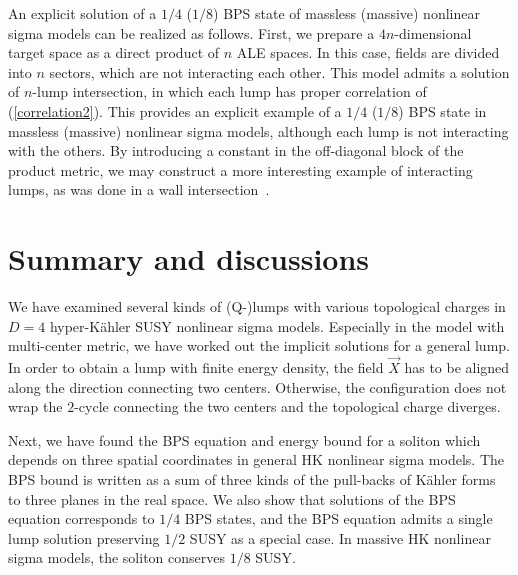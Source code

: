 \documentclass[a4paper,12pt]{article}
\newcommand{\kahler}{K\"{a}hler }
\begin{document}
An explicit solution of 
a $1/4$ ($1/8$) BPS state 
of massless (massive) nonlinear sigma models 
can be realized as follows. 
First, we prepare a $4n$-dimensional target space as  
a direct product of $n$ ALE spaces. 
In this case, fields are divided into $n$ sectors, 
which are not interacting  each other. 
This model admits a solution of $n$-lump intersection, 
in which each lump has proper 
correlation of (\ref{correlation2}). 
This provides an explicit example of a $1/4$ ($1/8$) BPS state 
in massless (massive) nonlinear sigma models, 
although each lump is not interacting with the others.
By introducing a constant in 
the off-diagonal block of the product metric, 
we may construct 
a more interesting example of 
interacting lumps, 
as was done in a wall intersection~\cite{Townsend1}.

\vspace{5mm}

\section{Summary and discussions}
\label{sc:Summary}
We have examined several kinds of (Q-)lumps with various topological 
charges in $D=4$ hyper-\kahler SUSY nonlinear sigma models. 
Especially 
in the model 
with multi-center metric, we have worked 
out the implicit solutions for a general 
lump. 
In order to obtain a lump with finite energy density, 
the field $\vec{X}$ has to be aligned along the direction 
connecting two centers. 
Otherwise, the configuration does not wrap the $2$-cycle connecting 
the two centers and the topological charge diverges. 

Next, we have found the BPS equation and energy bound for a soliton 
which depends on three spatial coordinates 
 in general HK nonlinear sigma models. 
The BPS bound is written as a sum of three kinds of the pull-backs 
of \kahler forms to three planes in the real space. 
We also show that solutions of the BPS equation corresponds to 
$1/4$ BPS states, and the BPS equation admits a single lump solution 
preserving $1/2$ SUSY as a special case. 
In massive HK nonlinear sigma models, the soliton conserves $1/8$ SUSY. 
\end{document}
